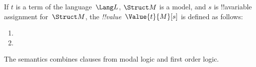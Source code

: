 \documentclass[../../../../include/open-logic-section]{subfiles}
\begin{document}
\begin{defn}
    If $t$ is a term of the language~$\Lang L$, $\Struct M$ is a 
     model, and $s$ is !!a{variable} assignment
    for~$\Struct M$, the \emph{!!{value}}~$\Value{t}{M}[s]$ is defined as
    follows:
    \begin{enumerate}
    \item {}
    \item {}
    \end{enumerate}
\end{defn}

The semantics combines clauses from modal logic and first order logic.
\end{document}
